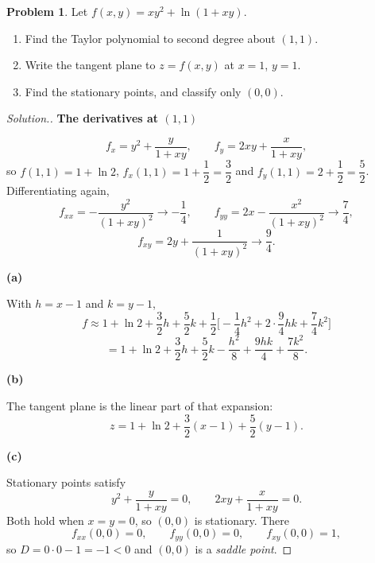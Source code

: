 \documentclass[11pt,a4paper]{article}
\theoremstyle{definition}
\newtheorem{problemx}{Problem}[subsection]
\newenvironment{problem}{\begin{problemx}}{\end{problemx}}
\newenvironment{solution}
  {\renewcommand{\qedsymbol}{}\begin{proof}[\textit{Solution}.]}
  {\end{proof}}
\newcommand{\subhead}[1]{%
  \par\medskip\noindent\textbf{#1}\par\nobreak\smallskip}
\begin{document}
\begin{problem}
Let $f(x,y) = xy^2+\ln(1+xy)$.
\begin{enumerate}
\item[(a)] Find the Taylor polynomial to second degree about $(1,1)$.
\item[(b)] Write the tangent plane to $z = f(x,y)$ at $x=1$, $y=1$.
\item[(c)] Find the stationary points, and classify only $(0,0)$.
\end{enumerate}
\end{problem}
\begin{solution}
\subhead{The derivatives at $(1,1)$}
$$f_x = y^2 + \frac{y}{1+xy},\qquad f_y = 2xy + \frac{x}{1+xy},$$
so $f(1,1) = 1+\ln 2$, $f_x(1,1) = 1+\dfrac12 = \dfrac32$ and
$f_y(1,1) = 2+\dfrac12 = \dfrac52$. Differentiating again,
$$f_{xx} = -\frac{y^2}{(1+xy)^2} \rightarrow -\frac14,\qquad
f_{yy} = 2x - \frac{x^2}{(1+xy)^2} \rightarrow \frac74,$$
$$f_{xy} = 2y + \frac{1}{(1+xy)^2} \rightarrow \frac94 .$$

\subhead{(a)}
With $h = x-1$ and $k = y-1$,
$$f \approx 1+\ln 2 + \frac32h + \frac52k
+ \frac12\Big[-\frac14h^2 + 2\cdot\frac94hk + \frac74k^2\Big]$$
$$= 1+\ln 2 + \frac32h + \frac52k - \frac{h^2}{8} + \frac{9hk}{4}
+ \frac{7k^2}{8}.$$

\subhead{(b)}
The tangent plane is the linear part of that expansion:
$$z = 1+\ln 2 + \frac32(x-1) + \frac52(y-1).$$

\subhead{(c)}
Stationary points satisfy
$$y^2 + \frac{y}{1+xy} = 0,\qquad 2xy + \frac{x}{1+xy} = 0 .$$
Both hold when $x=y=0$, so $(0,0)$ is stationary. There
$$f_{xx}(0,0) = 0,\qquad f_{yy}(0,0) = 0,\qquad f_{xy}(0,0) = 1 ,$$
so $D = 0\cdot 0 - 1 = -1 < 0$ and $(0,0)$ is a \emph{saddle point}.
\end{solution}
\end{document}
